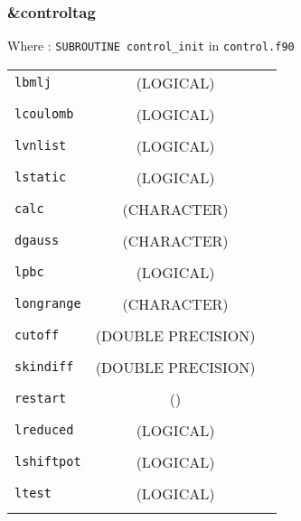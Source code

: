 \documentclass[10pt,a4paper]{article}
\begin{document}
\subsubsection{\&controltag }

Where : \verb?SUBROUTINE control_init? in \verb?control.f90?
\newline

\begin{tabular}{lcc}
\\
\verb?lbmlj?     & (LOGICAL)          &   \\
\\
\verb?lcoulomb?  & (LOGICAL)          &   \\
\\
\verb?lvnlist?   & (LOGICAL)          &   \\
\\
\verb?lstatic?   & (LOGICAL)          &   \\
\\
\verb?calc?      & (CHARACTER)        &   \\
\\
\verb?dgauss?    & (CHARACTER)        &   \\
\\
\verb?lpbc?      & (LOGICAL)          &   \\
\\
\verb?longrange? & (CHARACTER)        &   \\
\\
\verb?cutoff?    & (DOUBLE PRECISION) &   \\
\\
\verb?skindiff?  & (DOUBLE PRECISION) &   \\
\\
\verb?restart?   & ()                 &   \\
\\
\verb?lreduced?  & (LOGICAL)          &   \\
\\
\verb?lshiftpot? & (LOGICAL)          &   \\
\\
\verb?ltest?     & (LOGICAL)          &   \\
\\
\end{tabular}

\end{document}
